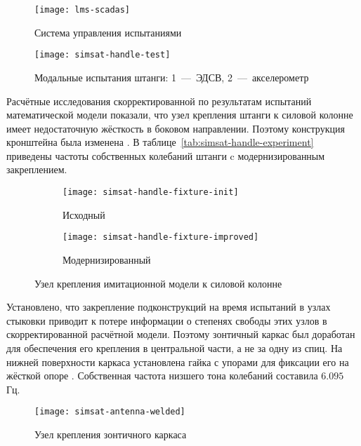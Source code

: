\begin{figure}[!htb]
	\centerfloat
	\texttt{[image: lms-scadas]}
	\caption{Система управления испытаниями } \label{fig:lms-scadas}
\end{figure}

\begin{figure}[!htb]
	\centerfloat
	\texttt{[image: simsat-handle-test]}
	\caption{Модальные испытания штанги: 1~---~ЭДСВ, 2~---~акселерометр} \label{fig:simsat-handle-test}
\end{figure}

Расчётные исследования скорректированной по результатам испытаний математической модели показали, что узел крепления штанги к силовой колонне имеет недостаточную жёсткость в боковом направлении. Поэтому конструкция кронштейна была изменена . В таблице~\ref{tab:simsat-handle-experiment} приведены частоты собственных колебаний штанги c модернизированным закреплением.

\begin{figure}[!htb]
	\centering
	\begin{subfigure}[t]{0.335\textwidth}
		\centering
		\texttt{[image: simsat-handle-fixture-init]}
		\caption{Исходный}
	\end{subfigure}
	\qquad
	\begin{subfigure}[t]{0.35\textwidth}
		\centering
		\texttt{[image: simsat-handle-fixture-improved]}
		\caption{Модернизированный}
	\end{subfigure}	
	\caption{Узел крепления имитационной модели к силовой колонне} \label{fig:simsat-handle-fixture}
\end{figure}

Установлено, что закрепление подконструкций на время испытаний в узлах стыковки приводит к потере информации о степенях свободы этих узлов в скорректированной расчётной модели. Поэтому зонтичный каркас был доработан для обеспечения его крепления в центральной части, а не за одну из спиц. На нижней поверхности каркаса установлена гайка с упорами для фиксации его на жёсткой опоре . Собственная частота низшего тона колебаний составила $ 6.095 $ Гц.

\begin{figure}[!htb]
	\centerfloat
	\texttt{[image: simsat-antenna-welded]}
	\caption{Узел крепления зонтичного каркаса} \label{fig:simsat-antenna-welded}
\end{figure}

